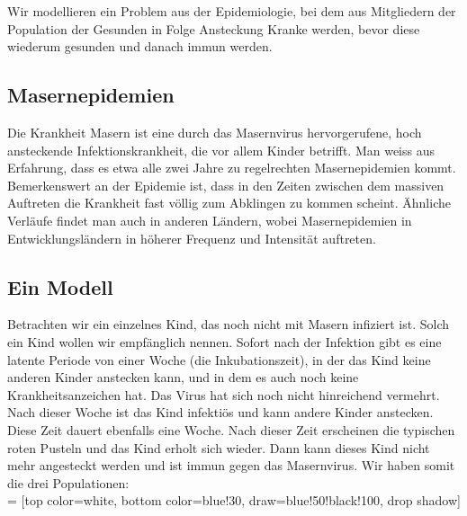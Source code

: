 \documentclass[%
11pt,%
twoside,%
titlepage,%
german,%
headsepline%
]{scrartcl}
\newcommand{\definition}[1]{\colorbox{emerald}{#1}}
\begin{document}
Wir modellieren ein Problem aus der Epidemiologie, bei dem aus Mitgliedern der Population der Gesunden in Folge Ansteckung Kranke werden, bevor diese wiederum gesunden und danach immun werden.

\subsection{Masernepidemien}
Die Krankheit Masern ist eine durch das Masernvirus hervorgerufene, hoch ansteckende Infektionskrankheit, die vor allem Kinder betrifft. Man weiss aus Erfahrung, dass es etwa alle zwei Jahre zu regelrechten Masernepidemien kommt. Bemerkenswert an der Epidemie ist, dass in den Zeiten zwischen dem massiven Auftreten die Krankheit fast völlig zum Abklingen zu kommen scheint. Ähnliche Verläufe findet man auch in anderen Ländern, wobei Masernepidemien in Entwicklungsländern in höherer Frequenz und Intensität auftreten.

\subsection{Ein Modell}
Betrachten wir ein einzelnes Kind, das noch nicht mit Masern infiziert ist. Solch ein Kind wollen wir \definition{empfänglich} nennen. Sofort nach der Infektion gibt es eine latente Periode von einer Woche (die \definition{Inkubationszeit}), in der das Kind keine anderen Kinder anstecken kann, und in dem es auch noch keine Krankheitsanzeichen hat. Das Virus hat sich noch nicht hinreichend vermehrt. Nach dieser Woche ist das Kind \definition{infektiös} und kann andere Kinder anstecken. Diese Zeit dauert ebenfalls eine Woche. Nach dieser Zeit erscheinen die typischen roten Pusteln und das Kind erholt sich wieder. Dann kann dieses Kind nicht mehr angesteckt werden und ist \definition{immun} gegen das Masernvirus. Wir haben somit die drei Populationen:\\

 = [top color=white, bottom color=blue!30, 
                            draw=blue!50!black!100, drop shadow]
\end{document}
